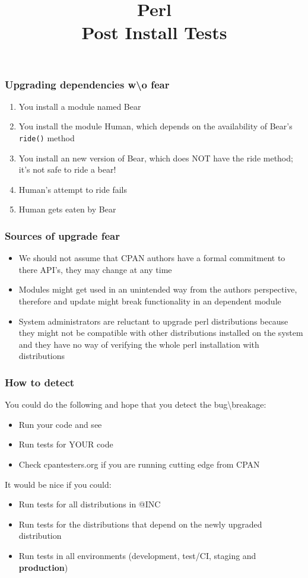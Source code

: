 \documentclass[10pt]{beamer}
\title{Perl \\ Post Install Tests}
\begin{document}
\begin{frame}
\titlepage
\end{frame}


\begin{frame}
\frametitle{Upgrading dependencies w\textbackslash o fear}
\begin{enumerate}
  \item You install a module named Bear
  \item You install the module Human, which depends on the availability of Bear's \verb|ride()| method
  \item You install an new version of Bear, which does NOT have the ride method; it's not safe to ride a bear!
  \item Human's attempt to ride fails
  \item Human gets eaten by Bear
\end{enumerate}
\end{frame}

\begin{frame}
\frametitle{Sources of upgrade fear}
\begin{itemize}
\item We should not assume that CPAN authors have a formal commitment to there API's, they may change at any time
\item Modules might get used in an unintended way from the authors perspective, therefore and update might break functionality in an dependent module
\item System administrators are reluctant to upgrade perl distributions because they might not be compatible with other distributions installed on the system and they have no way of verifying the whole perl installation with distributions
\end{itemize}
\end{frame}

\begin{frame}
\frametitle{How to detect}
You could do the following and hope that you detect the bug\textbackslash breakage:
\begin{itemize}
\item Run your code and see
\item Run tests for YOUR code
\item Check cpantesters.org if you are running cutting edge from CPAN
\end{itemize}
\vspace{5 mm}
It would be nice if you could:
\begin{itemize}
\item Run tests for all distributions in @INC 
\item Run tests for the distributions that depend on the newly upgraded distribution
\item Run tests in all environments (development, test/CI, staging and {\bf production})
\end{itemize}
\end{frame}
\end{document}
